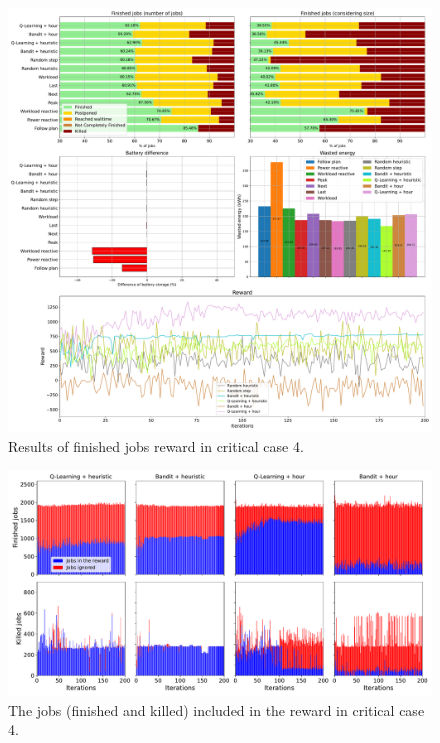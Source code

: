 \begin{figure}[!htb]
    \centering
    \includegraphics[scale=0.29]{Images/Learning_compensations/reward_finished_touched_profile_worst_workload_2_with_noise_state_delta.pdf}
    \caption{Results of finished jobs reward in critical case 4.}
    \label{fig:touched_reward_results_critical_4}
\end{figure}

\begin{figure}[!htb]
    \centering
    \includegraphics[scale=0.33]{Images/Learning_compensations/ignored_jobs_touched_scenario_4.pdf}
    \caption{The jobs (finished and killed) included in the reward in critical case 4.}
    \label{fig:reward_from_jobs_critical_4}
\end{figure}

